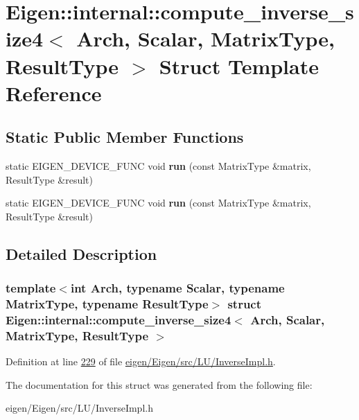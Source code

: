 \hypertarget{struct_eigen_1_1internal_1_1compute__inverse__size4}{}\section{Eigen\+:\+:internal\+:\+:compute\+\_\+inverse\+\_\+size4$<$ Arch, Scalar, Matrix\+Type, Result\+Type $>$ Struct Template Reference}
\label{struct_eigen_1_1internal_1_1compute__inverse__size4}
\subsection*{Static Public Member Functions}
\begin{DoxyCompactItemize}
\item 
\mbox{\label{struct_eigen_1_1internal_1_1compute__inverse__size4_a469e6f0a3d8fcc11aeeed9df5add3843}} 
static E\+I\+G\+E\+N\+\_\+\+D\+E\+V\+I\+C\+E\+\_\+\+F\+U\+NC void {\bfseries run} (const Matrix\+Type \&matrix, Result\+Type \&result)
\item 
\mbox{\label{struct_eigen_1_1internal_1_1compute__inverse__size4_a469e6f0a3d8fcc11aeeed9df5add3843}} 
static E\+I\+G\+E\+N\+\_\+\+D\+E\+V\+I\+C\+E\+\_\+\+F\+U\+NC void {\bfseries run} (const Matrix\+Type \&matrix, Result\+Type \&result)
\end{DoxyCompactItemize}


\subsection{Detailed Description}
\subsubsection*{template$<$int Arch, typename Scalar, typename Matrix\+Type, typename Result\+Type$>$\newline
struct Eigen\+::internal\+::compute\+\_\+inverse\+\_\+size4$<$ Arch, Scalar, Matrix\+Type, Result\+Type $>$}



Definition at line \hyperlink{eigen_2_eigen_2src_2_l_u_2_inverse_impl_8h_source_l00229}{229} of file \hyperlink{eigen_2_eigen_2src_2_l_u_2_inverse_impl_8h_source}{eigen/\+Eigen/src/\+L\+U/\+Inverse\+Impl.\+h}.



The documentation for this struct was generated from the following file\+:\begin{DoxyCompactItemize}
\item 
eigen/\+Eigen/src/\+L\+U/\+Inverse\+Impl.\+h\end{DoxyCompactItemize}
